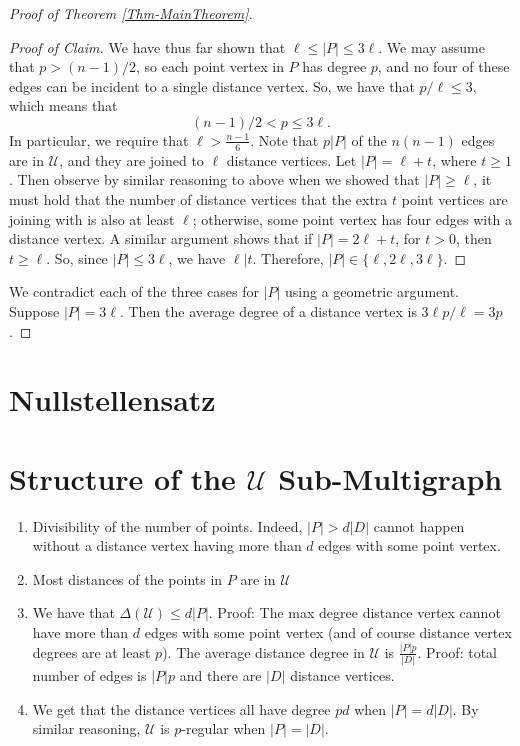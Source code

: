 \documentclass[12pt]{article}
\theoremstyle{definition}
\begin{document}
\begin{proof}[Proof of Theorem \ref{Thm-MainTheorem}]
\begin{proof}[Proof of Claim]
			We have thus far shown that $\ell \leq |P| \leq 3\ell$.  
			We may assume that $p > (n-1)/2$, so each point vertex in $P$ has degree $p$, and no four of these edges can be incident to a single distance vertex.  So, we have that $p/\ell \leq 3$, which means that
			$$(n-1)/2 < p \leq 3\ell.$$
			In particular, we require that $\ell > \tfrac{n-1}{6}$.  Note that $p |P|$ of the $n(n-1)$ edges are in $\mathcal{U}$, and they are joined to $\ell$ distance vertices.  Let $|P| = \ell + t$, where $t \geq 1$.  Then observe by similar reasoning to above when we showed that $|P| \geq \ell$, it must hold that the number of distance vertices that the extra $t$ point vertices are joining with is also at least $\ell$; otherwise, some point vertex has four edges with a distance vertex.  A similar argument shows that if $|P| = 2\ell + t$, for $t >0$, then $t \geq \ell$.  So, since $|P| \leq 3\ell$, we have $\ell | t$.  Therefore, $|P| \in \{\ell, 2\ell, 3\ell\}$. \qedhere
		\end{proof}
		 We contradict each of the three cases for $|P|$ using a geometric argument.
		 Suppose $|P| = 3\ell$.  Then the average degree of a distance vertex is $3\ell p /\ell = 3p$.
	\end{proof}
	
	\section{Nullstellensatz}
	
	\section{Structure of the $\mathcal{U}$ Sub-Multigraph}
	
	\begin{enumerate}
		\item Divisibility of the number of points.  Indeed, $|P| > d |D|$ cannot happen without a distance vertex having more than $d$ edges with some point vertex.
		\item Most distances of the points in $P$ are in $\mathcal{U}$
		\item We have that $\Delta(\mathcal{U}) \leq d|P|$.  Proof: The max degree distance vertex cannot have more than $d$ edges with some point vertex (and of course distance vertex degrees are at least $p$).  The average distance degree in $\mathcal{U}$ is $\tfrac{|P|p}{|D|}$.  Proof: total number of edges is $|P|p$ and there are $|D|$ distance vertices.
		\item We get that the distance vertices all have degree $pd$ when $|P| = d|D|$.  By similar reasoning, $\mathcal{U}$ is $p$-regular when $|P| = |D|$.
	\end{enumerate}
	
\end{document}
